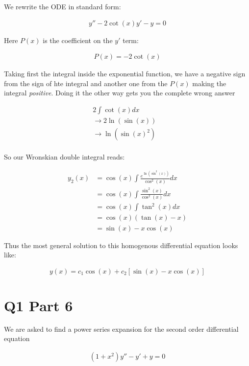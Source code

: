 \documentclass[paper=a4, fontsize=11pt]{scrartcl} %
\numberwithin{equation}{section} %
\numberwithin{figure}{section} %
\numberwithin{table}{section} %
\begin{document}
\hspace{2mm}

We rewrite the ODE in standard form:

\begin{align}
y'' - 2\cot(x) y' - y = 0
\end{align}

Here $P(x)$ is the coefficient on the $y'$ term:

\begin{align}
P(x) = - 2 \cot(x)
\end{align}

Taking first the integral inside the exponential function, we have a negative sign from the sign of hte integral and another one from the $P(x)$ making the integral \textit{positive}. Doing it the other way gets you the complete wrong answer

\begin{align}
2\int \cot(x) dx & \\
\rightarrow 2 \ln (\sin(x)) & \\
\rightarrow  \ln (\sin(x)^{2}) & \\
\end{align}

So our Wronskian double integral reads:

\begin{align}
y_2(x) &= \cos(x) \int \frac{e^{\ln(\sin^2(x))}}{\cos^2(x)} dx \\
&= \cos(x) \int \frac{\sin^2(x)}{\cos^2(x)} dx \\
&= \cos(x) \int \tan^2(x) dx \\
&= \cos(x) (\tan(x) - x) \\ 
&= \sin(x) - x\cos(x)
\end{align}

Thus the most general solution to this homogenous differential equation looks like:

\begin{align}
y(x) = c_1 \cos(x) + c_2 \left[\sin(x) - x \cos(x) \right]
\end{align}

\section{Q1 Part 6}

We are asked to find a power series expansion for the second order differential equation

\begin{align}
(1 + x^2) y'' - y' + y = 0 
\end{align}
\end{document}

